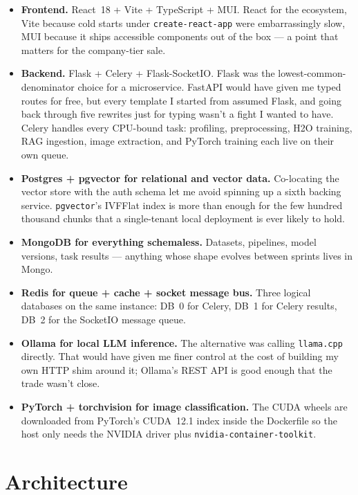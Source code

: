 \documentclass[12pt, a4paper]{report}
\begin{document}
\begin{itemize}
    \item \textbf{Frontend.} React~18 + Vite + TypeScript + MUI. React
        for the ecosystem, Vite because cold starts under
        \texttt{create-react-app} were embarrassingly slow, MUI
        because it ships accessible components out of the box ---
        a point that matters for the company-tier sale.
    \item \textbf{Backend.} Flask + Celery + Flask-SocketIO. Flask
        was the lowest-common-denominator choice for a
        microservice. FastAPI would have given me typed routes
        for free, but every template I started from assumed
        Flask, and going back through five rewrites just for
        typing wasn't a fight I wanted to have. Celery handles
        every CPU-bound task: profiling, preprocessing, H2O
        training, RAG ingestion, image extraction, and PyTorch
        training each live on their own queue.
    \item \textbf{Postgres + pgvector for relational and vector
        data.} Co-locating the vector store with the auth schema
        let me avoid spinning up a sixth backing service.
        \texttt{pgvector}'s IVFFlat index is more than enough for
        the few hundred thousand chunks that a single-tenant
        local deployment is ever likely to hold.
    \item \textbf{MongoDB for everything schemaless.} Datasets,
        pipelines, model versions, task results --- anything
        whose shape evolves between sprints lives in Mongo.
    \item \textbf{Redis for queue + cache + socket message bus.}
        Three logical databases on the same instance: DB~0 for
        Celery, DB~1 for Celery results, DB~2 for the SocketIO
        message queue.
    \item \textbf{Ollama for local LLM inference.} The alternative
        was calling \texttt{llama.cpp} directly. That would have
        given me finer control at the cost of building my own
        HTTP shim around it; Ollama's REST API is good enough
        that the trade wasn't close.
    \item \textbf{PyTorch + torchvision for image classification.}
        The CUDA wheels are downloaded from PyTorch's CUDA~12.1
        index inside the Dockerfile so the host only needs the
        NVIDIA driver plus \texttt{nvidia-container-toolkit}.
\end{itemize}

\section{Architecture}
\end{document}
